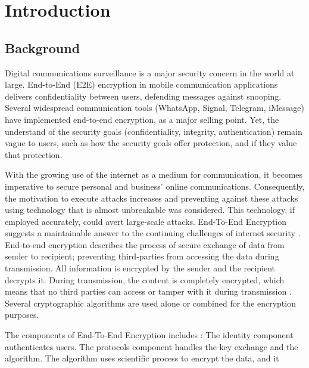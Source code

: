
\newpage
{} %

\chapter{Introduction}
\section{Background}\label{sec:bkgrnd}%
Digital communications surveillance is a major
security concern in the world at large. End-to-End (E2E)
encryption in mobile communication applications delivers
confidentiality between users, defending messages against
snooping. Several widespread communication tools
(WhatsApp, Signal, Telegram, iMessage) have implemented
end-to-end encryption, as a major selling point. Yet, the
understand of the security goals (confidentiality, integrity,
authentication) remain vague to users, such as how the
security goals offer protection, and if they value that
protection.\par
With the growing use of the internet as a medium for
communication, it becomes imperative to secure personal
and business’ online communications. Consequently, the
motivation to execute attacks increases and preventing
against these attacks using technology that is almost
unbreakable was considered. This technology, if employed
accurately, could avert large-scale attacks. End-To-End
Encryption suggests a maintainable answer to the continuing
challenges of internet security . End-to-end encryption
describes the process of secure exchange of data from
sender to recipient; preventing third-parties from accessing
the data during transmission. All information is encrypted by
the sender and the recipient decrypts it. During
transmission, the content is completely encrypted, which
means that no third parties can access or tamper with it
during transmission . Several cryptographic algorithms
are used alone or combined for the encryption purposes.\par
The components of End-To-End Encryption includes :
The identity component authenticates users. The protocols
component handles the key exchange and the algorithm. The
algorithm uses scientific process to encrypt the data, and it
